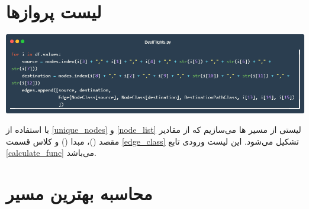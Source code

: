 \documentclass[12pt, dvipsnames, svgnames, x11names,]{article}
\begin{document}
	


	\section{لیست پروازها} \label{edges_list}

		{\includegraphics[width=14cm]{images/code08}} \par
		{\normalsize 
			با استفاده از \ref{unique_nodes} و \ref{node_list} لیستی از مسیر ها می‌سازیم که از مقادیر مقصد ()، مبدا () و کلاس قسمت \ref{edge_class} تشکیل می‌شود. این لیست ورودی تابع \ref{calculate_func} می‌باشد.
		}

	


	\section{محاسبه بهترین مسیر} \label{shortest_path_func}
\end{document}
